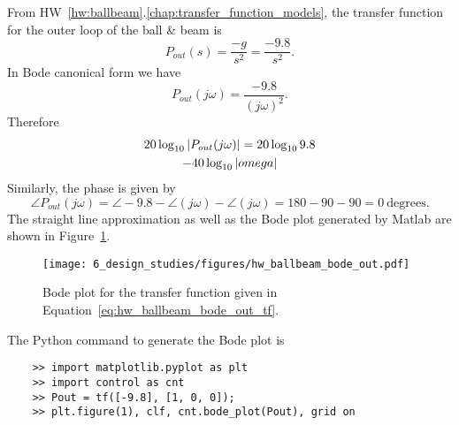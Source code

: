 From HW~\ref{hw:ballbeam}.\ref{chap:transfer_function_models}, the transfer function for the outer loop of the ball \& beam  is 
\begin{equation}\label{eq:hw_ballbeam_bode_out_tf}
P_{out}(s) = \frac{-g}{s^2} = 
\frac{-9.8}{s^2}. 
\end{equation}
In Bode canonical form we have
\[
P_{out}(j\omega) = \frac{-9.8}{(j\omega)^2}.
\]
Therefore
\begin{multline*}
20\log_{10}\left|P_{out}(j\omega)\right|=
	20\log_{10} 9.8 \\
	-40\log_{10}\left|omega\right|
\end{multline*}
Similarly, the phase is given by
\[
\angle P_{out}(j\omega) = 
	\angle -9.8 
	- \angle (j\omega)
	- \angle (j\omega) = 180 - 90 - 90 = 0~\text{degrees}.
\]
The straight line approximation as well as the Bode plot generated by Matlab are shown in Figure~\ref{fig:hw_ballbeam_bode_out}.
\begin{figure}[H]
   \centering
   \texttt{[image: 6\_design\_studies/figures/hw\_ballbeam\_bode\_out.pdf]}
   \caption{Bode plot for the transfer function given in Equation~\eqref{eq:hw_ballbeam_bode_out_tf}.}
   \label{fig:hw_ballbeam_bode_out}
\end{figure}
The Python command to generate the Bode plot is
\begin{lstlisting}
	>> import matplotlib.pyplot as plt
	>> import control as cnt
	>> Pout = tf([-9.8], [1, 0, 0]);
	>> plt.figure(1), clf, cnt.bode_plot(Pout), grid on
\end{lstlisting}
